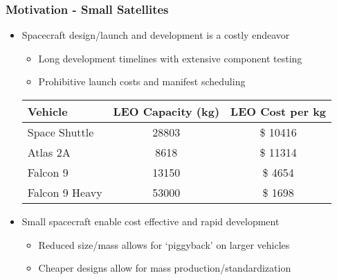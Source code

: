 

\begin{frame} %
\frametitle{Motivation - Small Satellites} %
	\begin{itemize}
		\item Spacecraft design/launch and development is a costly endeavor
			\begin{itemize}
				\item Long development timelines with extensive component testing
				\item Prohibitive launch costs and manifest scheduling
			\end{itemize}
			\pause
		\begin{table}
        \begin{tabular}{l | c | c }
        	Vehicle & LEO Capacity (\si{\kilogram}) & LEO Cost per \si{\kilogram} \\
        	\hline \hline
        	Space Shuttle & \num{28803} & \$ \num{10416}  \\ 
        	Atlas 2A & \num{8618} & \$ \num{11314} \\
        	Falcon 9 & \num{13150} & \$ \num{4654} \\
        	Falcon 9 Heavy & \num{53000} & \$ \num{1698}
        \end{tabular}
        \end{table}
		\item Small spacecraft enable cost effective and rapid development
	
			\begin{itemize}
				\item Reduced size/mass allows for `piggyback' on larger vehicles
				\item Cheaper designs allow for mass production/standardization 
			\end{itemize}

	\end{itemize}
\end{frame}   %

